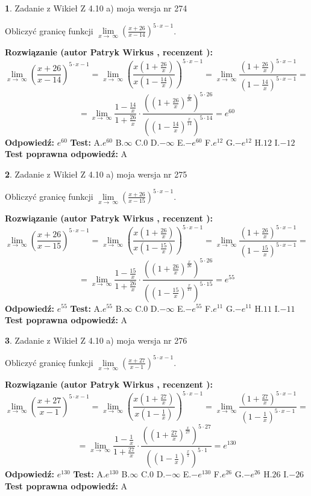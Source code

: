 \documentclass[12pt, a4paper]{article}
\theoremstyle{definition} %
\newtheorem{zad}{}
\newcommand{\zadStart}[1]{\begin{zad}#1\newline}
\newcommand{\zadStop}{\end{zad}}
\newcommand{\rozwStart}[2]{\noindent \textbf{Rozwiązanie (autor #1 , recenzent #2): }\newline}
\newcommand{\rozwStop}{\newline}
\newcommand{\odpStart}{\noindent \textbf{Odpowiedź:}\newline}
\newcommand{\odpStop}{\newline}
\newcommand{\testStart}{\noindent \textbf{Test:}\newline}
\newcommand{\testStop}{\newline}
\newcommand{\kluczStart}{\noindent \textbf{Test poprawna odpowiedź:}\newline}
\newcommand{\kluczStop}{\newline}
\begin{document}
\zadStart{Zadanie z Wikieł Z 4.10 a) moja wersja nr 274}

Obliczyć granicę funkcji  $\lim\limits_{x\to\ \infty}(\frac{x+26}{x-14})^{5\cdot x-1}$.
\zadStop
\rozwStart{Patryk Wirkus}{}
$$\lim\limits_{x\to\ \infty}(\frac{x+26}{x-14})^{5\cdot x-1} = \lim\limits_{x\to\ \infty}(\frac{x(1+\frac{26}{x})}{x(1-\frac{14}{x})})^{5\cdot x-1}=\lim\limits_{x\to\ \infty}\frac{(1+\frac{26}{x})^{5\cdot x-1}}{(1-\frac{14}{x})^{5\cdot x-1}}=$$
$$=\lim\limits_{x\to\ \infty}\frac{1-\frac{14}{x}}{1+\frac{26}{x}}\cdot\frac{((1+\frac{26}{x})^{\frac{x}{26}})^{5\cdot26}}{((1-\frac{14}{x})^{\frac{x}{14}})^{5\cdot14}}=e^{60}$$
\rozwStop
\odpStart
$e^{60}$
\odpStop
\testStart
A.$e^{60}$ B.$\infty$ C.$0$ D.$-\infty$ E.$-e^{60}$
F.$e^{12}$ G.$-e^{12}$
H.$12$
I.$-12$
\testStop
\kluczStart
A
\kluczStop



\zadStart{Zadanie z Wikieł Z 4.10 a) moja wersja nr 275}

Obliczyć granicę funkcji  $\lim\limits_{x\to\ \infty}(\frac{x+26}{x-15})^{5\cdot x-1}$.
\zadStop
\rozwStart{Patryk Wirkus}{}
$$\lim\limits_{x\to\ \infty}(\frac{x+26}{x-15})^{5\cdot x-1} = \lim\limits_{x\to\ \infty}(\frac{x(1+\frac{26}{x})}{x(1-\frac{15}{x})})^{5\cdot x-1}=\lim\limits_{x\to\ \infty}\frac{(1+\frac{26}{x})^{5\cdot x-1}}{(1-\frac{15}{x})^{5\cdot x-1}}=$$
$$=\lim\limits_{x\to\ \infty}\frac{1-\frac{15}{x}}{1+\frac{26}{x}}\cdot\frac{((1+\frac{26}{x})^{\frac{x}{26}})^{5\cdot26}}{((1-\frac{15}{x})^{\frac{x}{15}})^{5\cdot15}}=e^{55}$$
\rozwStop
\odpStart
$e^{55}$
\odpStop
\testStart
A.$e^{55}$ B.$\infty$ C.$0$ D.$-\infty$ E.$-e^{55}$
F.$e^{11}$ G.$-e^{11}$
H.$11$
I.$-11$
\testStop
\kluczStart
A
\kluczStop



\zadStart{Zadanie z Wikieł Z 4.10 a) moja wersja nr 276}

Obliczyć granicę funkcji  $\lim\limits_{x\to\ \infty}(\frac{x+27}{x-1})^{5\cdot x-1}$.
\zadStop
\rozwStart{Patryk Wirkus}{}
$$\lim\limits_{x\to\ \infty}(\frac{x+27}{x-1})^{5\cdot x-1} = \lim\limits_{x\to\ \infty}(\frac{x(1+\frac{27}{x})}{x(1-\frac{1}{x})})^{5\cdot x-1}=\lim\limits_{x\to\ \infty}\frac{(1+\frac{27}{x})^{5\cdot x-1}}{(1-\frac{1}{x})^{5\cdot x-1}}=$$
$$=\lim\limits_{x\to\ \infty}\frac{1-\frac{1}{x}}{1+\frac{27}{x}}\cdot\frac{((1+\frac{27}{x})^{\frac{x}{27}})^{5\cdot27}}{((1-\frac{1}{x})^{\frac{x}{1}})^{5\cdot1}}=e^{130}$$
\rozwStop
\odpStart
$e^{130}$
\odpStop
\testStart
A.$e^{130}$ B.$\infty$ C.$0$ D.$-\infty$ E.$-e^{130}$
F.$e^{26}$ G.$-e^{26}$
H.$26$
I.$-26$
\testStop
\kluczStart
A
\kluczStop
\end{document}
